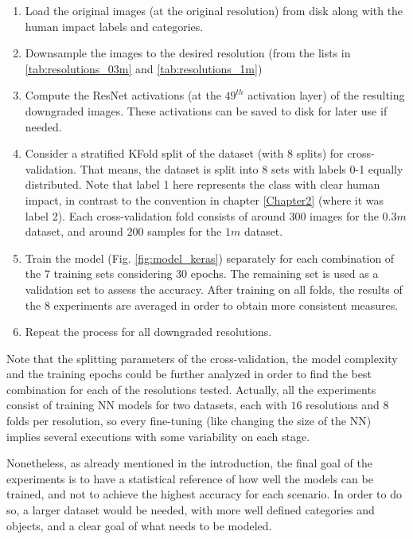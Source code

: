 \begin{enumerate}
	\item Load the original images (at the original resolution) from disk along with the human impact labels and categories.
	
	\item Downsample the images to the desired resolution (from the lists in \ref{tab:resolutions_03m} and \ref{tab:resolutions_1m})
	
	\item Compute the ResNet activations (at the $49^{th}$ activation layer) of the resulting downgraded images. These activations can be saved to disk for later use if needed.
	
	\item Consider a stratified KFold split of the dataset (with $8$ splits) for cross-validation. That means, the dataset is split into $8$ sets with labels 0-1 equally distributed. Note that label 1 here represents the class with clear human impact, in contrast to the convention in chapter \ref{Chapter2} (where it was label 2).  Each cross-validation fold consists of around $300$ images for the $0.3m$ dataset, and around $200$ samples for the $1m$ dataset.
	
	\item Train the model (Fig. \ref{fig:model_keras}) separately for each combination of the $7$ training sets considering 30 epochs. The remaining set is used as a validation set to assess the accuracy. After training on all folds, the results of the $8$ experiments are averaged in order to obtain more consistent measures.
	
	\item Repeat the process for all downgraded resolutions.
\end{enumerate}

Note that the splitting parameters of the cross-validation, the model complexity and the training epochs could be further analyzed in order to find the best combination for each of the resolutions tested. Actually, all the experiments consist of training NN models for two datasets, each with $16$ resolutions and $8$ folds per resolution, so every fine-tuning (like changing the size of the NN) implies several executions with some variability on each stage.

Nonetheless, as already mentioned in the introduction, the final goal of the experiments is to have a statistical reference of how well the models can be trained, and not to achieve the highest accuracy for each scenario. In order to do so, a larger dataset would be needed, with more well defined categories and objects, and a clear goal of what needs to be modeled.

